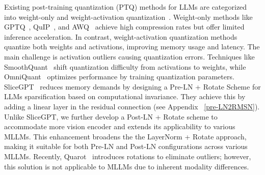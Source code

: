 Existing post-training quantization (PTQ) methods for LLMs are categorized into weight-only and weight-activation quantization~\citep{zhao2023survey, yuan2024llm,shang2023pb,yue2024wkvquant,hu2024llm,hu2025ostquant}. Weight-only methods like GPTQ~\citep{frantar2022gptq}, QuIP~\citep{chee2024quip}, and AWQ~\citep{lin2023awq} achieve high compression rates but offer limited inference acceleration. In contrast, weight-activation quantization methods~\citep{xiao2022smoothquant, wei2022outlier, yuan2023asvd, zhang2024qqq} quantize both weights and activations, improving memory usage and latency. The main challenge is activation outliers causing quantization errors. Techniques like SmoothQuant~\citep{xiao2022smoothquant} shift quantization difficulty from activations to weights, while OmniQuant~\citep{2023omniquant} optimizes performance by training quantization parameters. SliceGPT~\citep{ashkboos2024slicegpt} reduces memory demands by designing a Pre-LN + Rotate Scheme for LLMs sparsification based on computational invariance. They achieve this by adding a linear layer in the residual connection (see Appendix ~\ref{pre-LN2RMSN}). Unlike SliceGPT, we further develop a Post-LN + Rotate scheme to accommodate more vision encoder and extends its applicability to various MLLMs. This enhancement broadens the the LayerNorm + Rotate approach, making it suitable for both Pre-LN and Post-LN configurations across various MLLMs. Recently, Quarot~\citep{ashkboos2024quarot} introduces rotations to eliminate outliers; however, this solution is not applicable to MLLMs due to inherent modality differences.